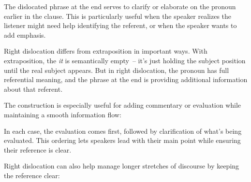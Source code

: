 \ea\label{ex:right-dis-basic}
   \z
\z

The dislocated phrase at the end serves to clarify or elaborate on the pronoun earlier in the clause. This is particularly useful when the speaker realizes the listener might need help identifying the referent, or when the speaker wants to add emphasis.

Right dislocation differs from extraposition in important ways. With extraposition, the \textit{it} is semantically empty~-- it's just holding the subject position until the real subject appears. But in right dislocation, the pronoun has full referential meaning, and the phrase at the end is providing additional information about that referent.

The construction is especially useful for adding commentary or evaluation while maintaining a smooth information flow:

\ea\label{ex:right-dis-comment}
   \z
\z

In each case, the evaluation comes first, followed by clarification of what's being evaluated. This ordering lets speakers lead with their main point while ensuring their reference is clear.

Right dislocation can also help manage longer stretches of discourse by keeping the reference clear:

\ea\label{ex:right-dis-discourse}
   \z
\z
